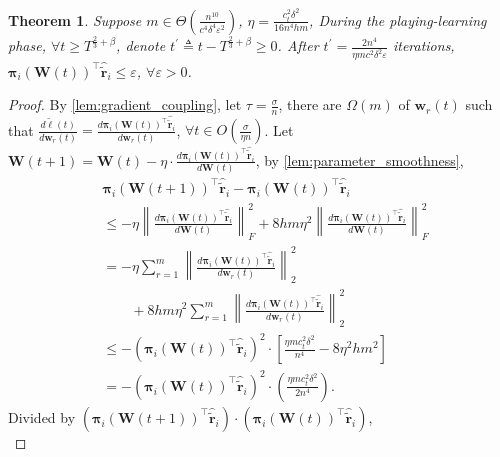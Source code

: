 \documentclass[10pt]{article}
\def\rvw{{\mathbf{w}}}
\def\rvtilder{{\tilde{\mathbf{r}}}}
\newtheorem{thm}{Theorem}
\def\rvpi{{\boldsymbol{\pi}}}
\def\rmW{{\mathbf{W}}}
\begin{document}
\begin{thm}
\label{thm:surrogate_expected_loss_convergence}
    Suppose $m \in \Theta\left( \frac{n^{10}}{c^4 \delta^4 \varepsilon^2} \right)$, $\eta = \frac{c_t^2 \delta^2}{16 n^4 h m}$, During the playing-learning phase, $\forall t \ge T^{\frac{2}{3} + \beta}$, denote $t^\prime \triangleq t - T^{\frac{2}{3} + \beta} \ge 0$. After $t^\prime = \frac{2n^4}{\eta m c^2 \delta^2 \varepsilon}$ iterations, $\rvpi_i\left( \rmW(t) \right)^\top \hat{\rvtilder}_i \le \varepsilon$, $\forall \varepsilon > 0$.
\end{thm}
\begin{proof}
    By \cref{lem:gradient_coupling}, let $\tau = \frac{\sigma}{n}$, there are $\Omega\left( m \right)$ of $\rvw_r(t)$ such that $\frac{d\tilde{\ell}(t)}{d \rvw_r(t)} = \frac{d \rvpi_i\left( \rmW(t) \right)^\top \hat{\rvtilder}_i}{d \rvw_r(t)}$, $\forall t \in O\left( \frac{\sigma}{\eta n} \right)$. Let $\rmW(t+1) = \rmW(t) - \eta \cdot \frac{d \rvpi_i\left( \rmW(t) \right)^\top \hat{\rvtilder}_i}{d \rmW(t)}$, by \cref{lem:parameter_smoothness},
\begin{equation*}
\begin{split}
    &\rvpi_i\left( \rmW(t+1) \right)^\top \hat{\rvtilder}_i - \rvpi_i\left( \rmW(t) \right)^\top \hat{\rvtilder}_i \\
    &\le - \eta \left\| \frac{d \rvpi_i\left( \rmW(t) \right)^\top \hat{\rvtilder}_i}{d \rmW(t)} \right\|_F^2 + 8 h m \eta^2 \left\| \frac{d \rvpi_i\left( \rmW(t) \right)^\top \hat{\rvtilder}_i}{d \rmW(t)} \right\|_F^2 \\
    &= - \eta \sum\limits_{r=1}^{m}{ \left\| \frac{d \rvpi_i\left( \rmW(t) \right)^\top \hat{\rvtilder}_i}{d \rvw_r(t)} \right\|_2^2 } \\
    &\qquad + 8 h m \eta^2 \sum\limits_{r=1}^{m}{ \left\| \frac{d \rvpi_i\left( \rmW(t) \right)^\top \hat{\rvtilder}_i}{d \rvw_r(t)} \right\|_2^2 } \\
    &\le - \left( \rvpi_i\left( \rmW(t) \right)^\top \hat{\rvtilder}_i \right)^2 \cdot \left[ \frac{\eta m c_t^2 \delta^2}{n^4} - 8 \eta^2 h m^2 \right] \\
    &= - \left( \rvpi_i\left( \rmW(t) \right)^\top \hat{\rvtilder}_i \right)^2 \cdot \left( \frac{\eta m c_t^2 \delta^2}{2n^4} \right).
\end{split}
\end{equation*}
Divided by $\left( \rvpi_i\left( \rmW(t+1) \right)^\top \hat{\rvtilder}_i\right) \cdot \left( \rvpi_i\left( \rmW(t) \right)^\top \hat{\rvtilder}_i \right)$,
\begin{equation*}

\end{equation*}
\end{proof}
\end{document}

